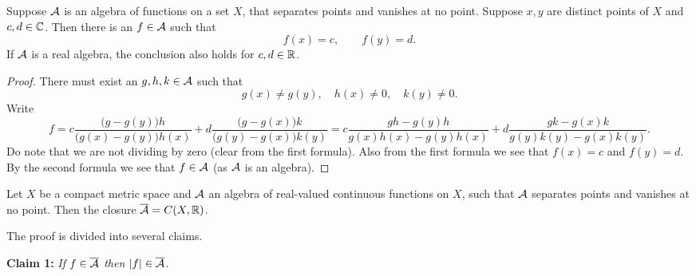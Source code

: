 \begin{prop} \label{prop:SWinterpolate}
Suppose ${\mathcal{A}}$ is an algebra of functions on a set $X$, that separates points
and vanishes at no point.  Suppose $x,y$ are distinct points of $X$ and
$c,d \in {\mathbb{C}}$.  Then there is an $f \in {\mathcal{A}}$ such that
\begin{equation*}
f(x) = c, \qquad f(y) = d .
\end{equation*}
If ${\mathcal{A}}$ is a real algebra, the conclusion also holds for $c,d \in {\mathbb{R}}$.
\end{prop}

\begin{proof}
There must exist an $g,h,k \in {\mathcal{A}}$
such that 
\begin{equation*}
g(x) \not= g(y), \quad h(x) \not= 0, \quad k(y) \not= 0 .
\end{equation*}
Write
\begin{equation*}
f = 
c
\frac{\bigl(g - g(y)\bigr)h}{\bigl(g(x)-g(y)\bigr)h(x) } + 
d
\frac{\bigl(g - g(x)\bigr)k}{\bigl(g(y)-g(x)\bigr)k(y)}
=
c
\frac{gh - g(y)h}{g(x)h(x)-g(y)h(x) } + 
d
\frac{gk - g(x)k}{g(y)k(y)-g(x)k(y)} .
\end{equation*}
Do note that we are not dividing by zero (clear from the first formula).
Also from the first formula we see that $f(x) = c$ and $f(y) = d$.
By the second formula we see that $f \in {\mathcal{A}}$ (as ${\mathcal{A}}$ is an algebra).
\end{proof}

\begin{thm}
\label{thm:SWreal}
Let $X$ be a compact metric space and ${\mathcal{A}}$ an algebra of real-valued
continuous functions on $X$, such that ${\mathcal{A}}$ separates points and vanishes at
no point.  Then the closure $\overline{{\mathcal{A}}} = C(X,{\mathbb{R}})$.
\end{thm}

The proof is divided into several claims.

\medskip

\noindent
\textbf{Claim 1:} \emph{If $f \in \overline{{\mathcal{A}}}$ then $\lvert {f} \rvert \in
\overline{{\mathcal{A}}}$.}

